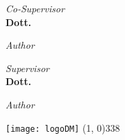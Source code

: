 \begin{titlepage}
\begin{center}
{\begin{large}
    \begin{flushleft}
    \textit{Co-Supervisor}\\ 
    \vspace{5pt} 
    \textbf{Dott. \myCoSupervisor}
    \end{flushleft}

    \vspace*{-4.23cm} 

    \begin{flushright}
    \textit{Author}\\ 
    \vspace{5pt} 
    \textbf{\myName}
    \end{flushright}
    \end{large}
}{
    \begin{large}
    \begin{flushleft}
    \textit{Supervisor}\\ 
    \vspace{5pt} 
    \textbf{Dott. \mySupervisor}
    \end{flushleft}

    \vspace*{-2.36cm} 

    \begin{flushright}
    \textit{Author}\\ 
    \vspace{5pt} 
    \textbf{\myName}
    \end{flushright}
    \end{large}
}

\vfill
\texttt{[image: logoDM]}
\line(1, 0){338} \\
\begin{normalsize}
\textsc{\myTime}
\end{normalsize}

\end{center}
\end{titlepage}
